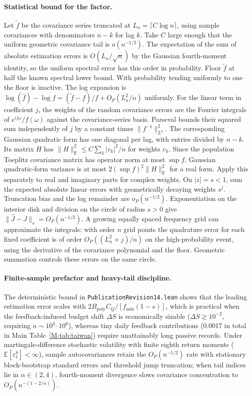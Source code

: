\documentclass[12pt]{article}
\theoremstyle{definition}
\theoremstyle{remark}
\newcommand{\E}{\mathbb{E}}
\begin{document}
\paragraph{Statistical bound for the factor.}
Let $\tilde f$ be the covariance series truncated at $L_n=\lceil C\log n\rceil$,
using sample covariances with denominators $n-k$ for lag $k$. Take $C$ large
enough that the uniform geometric covariance tail is $o(n^{-1/2})$.
The expectation of the sum of absolute estimation errors is $O(L_n/\sqrt n)$
by the Gaussian fourth-moment identity, so the uniform spectral error has this
order in probability. Floor $\tilde f$ at half the known spectral lower bound.
With probability tending uniformly to one the floor is inactive. The log
expansion is $\log(\hat f)-\log f=(\tilde f-f)/f+O_P(L_n^2/n)$ uniformly.
For the linear term in coefficient $j$, the weights of the random covariance
errors are the Fourier integrals of $e^{ij\omega}/f(\omega)$ against the
covariance-series basis. Parseval bounds their squared sum independently of
$j$ by a constant times $\|f^{-1}\|_{L^2}^2$. The corresponding Gaussian
quadratic form has one diagonal per lag, with entries divided by $n-k$.
Its matrix $H$ has $\|H\|_{\mathrm F}^2\le C\sum_k|v_k|^2/n$ for weights
$v_k$. Since the population Toeplitz covariance matrix has operator norm at most
$\sup f$, Gaussian quadratic-form variance is at most
$2(\sup f)^2\|H\|_{\mathrm F}^2$ for a real form. Apply this separately to
real and imaginary parts for complex weights. On $|z|=s<1$, sum the expected
absolute linear errors with geometrically decaying weights $s^j$.
Truncation bias and the log remainder are $o_P(n^{-1/2})$. Exponentiation on
the interior disk and division on the circle of radius $s>0$ give
$\|\hat J-J\|_s=O_P(n^{-1/2})$. A growing equally spaced frequency grid can
approximate the integrals: with order $n$ grid points the quadrature error
for each fixed coefficient is of order $O_P((L_n^2+j)/n)$ on the
high-probability event, using the derivative of the covariance polynomial
and the floor. Geometric summation controls these errors on the same circle.

\paragraph{Finite-sample prefactor and heavy-tail discipline.} The deterministic bound in \nolinkurl{PublicationRevision14.lean} shows that the leading estimation error scales with $2 B_{\mathrm{poly}} C_Q / [f_{\min}(1-s)]$, which is practical when the feedback-induced budget shift $\Delta S$ is economically sizable ($\Delta S \gtrsim 10^{-2}$, requiring $n \sim 10^4\text{--}10^6$), whereas tiny daily feedback contributions ($0.0017$ in total in Main Table~\ref{M-tab:taiwan}) require unattainably long passive records. Under martingale-difference stochastic volatility with finite eighth return moments ($\E[\varepsilon_t^8] < \infty$), sample autocovariances retain the $O_P(n^{-1/2})$ rate with stationary block-bootstrap standard errors and \citet{mancini2009} threshold jump truncation; when tail indices lie in $\alpha \in (2,4)$, fourth-moment divergence slows covariance concentration to $O_P(n^{-(1-2/\alpha)})$.
\end{document}
